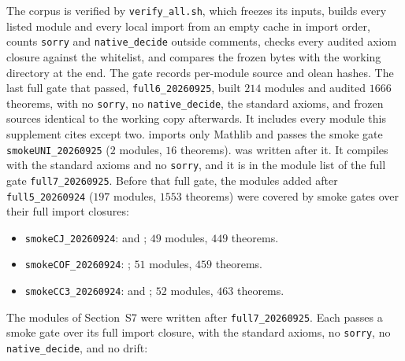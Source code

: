 The corpus is verified by \texttt{verify\_all.sh}, which freezes its inputs, builds every
listed module and every local import from an empty cache in import order, counts
\texttt{sorry} and \texttt{native\_decide} outside comments, checks every audited axiom
closure against the whitelist, and compares the frozen bytes with the working directory at
the end. The gate records per-module source and olean hashes. The last full gate that passed,
\texttt{full6\_20260925}, built $214$ modules and audited $1666$ theorems, with no
\texttt{sorry}, no \texttt{native\_decide}, the standard axioms, and frozen sources identical to
the working copy afterwards. It includes every module this supplement cites except two.
 imports only Mathlib and passes the smoke gate
\texttt{smokeUNI\_20260925} ($2$ modules, $16$ theorems).  was
written after it. It compiles with the standard axioms and no \texttt{sorry}, and it is in the
module list of the full gate \texttt{full7\_20260925}. Before that full gate, the modules
added after \texttt{full5\_20260924} ($197$ modules, $1553$ theorems) were covered by smoke gates
over their full import closures:
\begin{itemize}
\item \texttt{smokeCJ\_20260924}:  and
; $49$ modules, $449$ theorems.
\item \texttt{smokeCOF\_20260924}: ; $51$ modules, $459$
theorems.
\item \texttt{smokeCC3\_20260924}:  and
; $52$ modules, $463$ theorems.
\end{itemize}
The modules of Section~S7 were written after \texttt{full7\_20260925}. Each passes a smoke gate
over its full import closure, with the standard axioms, no \texttt{sorry}, no
\texttt{native\_decide}, and no drift:
